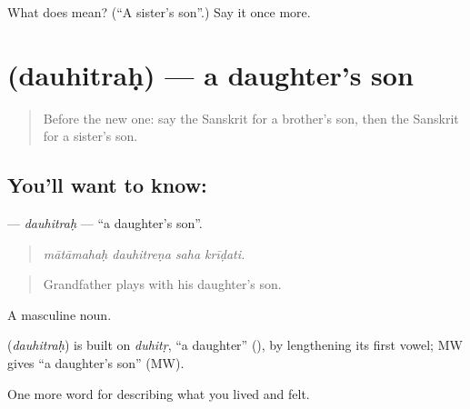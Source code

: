 \begin{tcolorbox}[breakable,colback=teal!4,colframe=teal!35!black,title={Before you move on}]
What does  mean? (\textquotedblleft{}A sister's son\textquotedblright{}.) Say it once more.
\end{tcolorbox}
\section[\texorpdfstring{\sk{दौहित्रः} (dauhitraḥ)}{दौहित्रः (dauhitraḥ)}]{ (dauhitraḥ) — a daughter's son}

\label{lesson:SA-C499-dauhitrah}



\begin{quote}
Before the new one: say the Sanskrit for a brother's son, then the Sanskrit for a sister's son.
\end{quote}

\subsection*{You'll want to know: }
\textbf{} — \emph{dauhitraḥ} — \textquotedblleft{}a daughter's son\textquotedblright{}.

\begin{quote}
   
\end{quote}

\begin{quote}
\emph{mātāmahaḥ dauhitreṇa saha krīḍati.}
\end{quote}

\begin{quote}
Grandfather plays with his daughter's son.
\end{quote}

A masculine noun.

\begin{cousinweb}
\textbf{} (\emph{dauhitraḥ}) is built on \emph{duhitṛ}, \textquotedblleft{}a daughter\textquotedblright{} (\textbf{}), by lengthening its first vowel; MW gives \textquotedblleft{}a daughter's son\textquotedblright{} (MW).
\end{cousinweb}

\begin{grammarlens}[title={What you've built}]
One more word for describing what you lived and felt.
\end{grammarlens}

